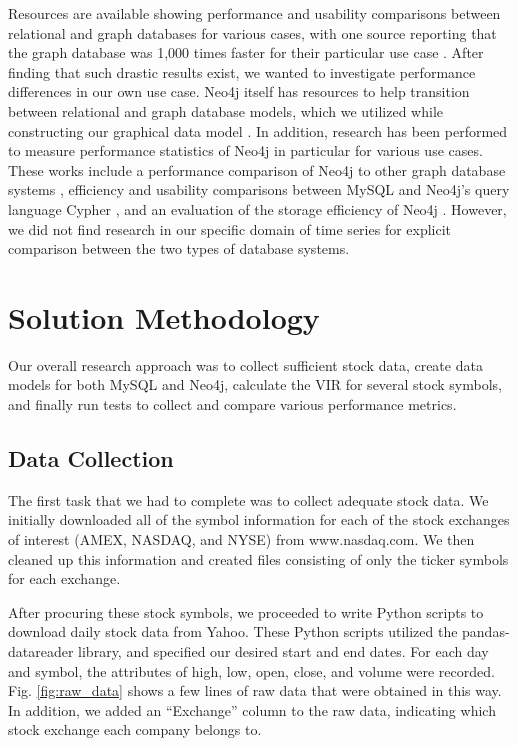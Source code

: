 \documentclass{IEEEtran}
\begin{document}
Resources are available showing performance and usability comparisons between relational and graph databases for various cases, with one source reporting that the graph database was 1,000 times faster for their particular use case \cite{dzone}. After finding that such drastic results exist, we wanted to investigate performance differences in our own use case. Neo4j itself has resources to help transition between relational and graph database models, which we utilized while constructing our graphical data model \cite{neo4j}. In addition, research has been performed to measure performance statistics of Neo4j in particular for various use cases. These works include a performance comparison of Neo4j to other graph database systems \cite{graph-query}, efficiency and usability comparisons between MySQL and Neo4j's query language Cypher \cite{graph-survey}, and an evaluation of the storage efficiency of Neo4j \cite{storage-perf}. However, we did not find research in our specific domain of time series for explicit comparison between the two types of database systems.

\section{Solution Methodology}

Our overall research approach was to collect sufficient stock data, create data models for both MySQL and Neo4j, calculate the VIR for several stock symbols, and finally run tests to collect and compare various performance metrics. 

\subsection{Data Collection}

The first task that we had to complete was to collect adequate stock data. We initially downloaded all of the symbol information for each of the stock exchanges of interest (AMEX, NASDAQ, and NYSE) from www.nasdaq.com. We then cleaned up this information and created files consisting of only the ticker symbols for each exchange. 

After procuring these stock symbols, we proceeded to write Python scripts to download daily stock data from Yahoo. These Python scripts utilized the pandas-datareader library, and specified our desired start and end dates. For each day and symbol, the attributes of high, low, open, close, and volume were recorded. Fig. \ref{fig:raw_data} shows a few lines of raw data that were obtained in this way. In addition, we added an “Exchange” column to the raw data, indicating which stock exchange each company belongs to. 
\end{document}
